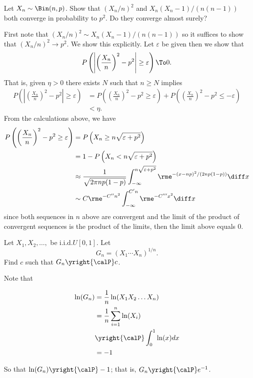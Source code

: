 \begin{problem}[DasGupta 7.17]
  Let \(X_n\sim\Bin(n,p)\). Show that \((X_n/n)^2\) and
  \(X_n(X_n-1)/(n(n-1))\) both converge in probability to \(p^2\). Do
  they converge almost surely?
\end{problem}
\begin{solution}
  First note that \((X_n/n)^2\sim X_n(X_n-1)/(n(n-1))\) so it suffices to
  show that \((X_n/n)^2\to p^2\). We show this explicitly. Let
  \(\varepsilon\) be given then we show that
  \[
    P\left(\left|\left(\frac{X_n}{n}\right)^2
        -p^2\right|\geq\varepsilon\right)\To 0.
  \]
  That is, given \(\eta>0\) there exists \(N\) such that \(n\geq N\)
  implies
  \begin{align*}
    P\left(\left|\left(\frac{X_n}{n}\right)^2
        -p^2\right|\geq\varepsilon\right)
    &=P\left(\left(\frac{X_n}{n}\right)^2
      -p^2\geq\varepsilon\right)
      +P\left(\left(\frac{X_n}{n}\right)^2
      -p^2\leq-\varepsilon\right)\\
    &<\eta.
  \end{align*}
  From the calculations above, we have
  \begin{align*}
    P\left(\left(\frac{X_n}{n}\right)^2
    -p^2\geq\varepsilon\right)
    &=P\left(X_n\geq n\sqrt{\varepsilon+p^2}\right)\\
    &=1-P\left(X_n<n\sqrt{\varepsilon+p^2}\right)\\
    &\approx\frac{1}{\sqrt{2\pi n p(1-p)}}\int_{-\infty}^{n\sqrt{\varepsilon+p^2}}
      \rme^{-(x-np)^2/(2np(1-p))}\diff x
    \\
    &\sim C\rme^{-C''n^2}\int_{-\infty}^{C'n}\rme^{-C'''x^2}\diff x
  \end{align*}
  since both sequences in \(n\) above are convergent and the limit of the
  product of convergent sequences is the product of the limits, then the
  limit above equals \(0\).
\end{solution}
\newpage

\begin{problem}[DasGupta 7.21]
  Let \(X_1,X_2,\dotsc,\) be i.i.d.\@ \(U[0,1]\). Let
  \[
    G_n=(X_1\dotsm X_n)^{1/n}.
  \]
  Find \(c\) such that \(G_n\yright{\calP} c\).
\end{problem}
\begin{solution}

Note that

\begin{align*}
  \ln(G_n) &= \frac{1}{n} \ln(X_1 X_2 \ldots X_n) \\
           &= \frac{1}{n} \sum_{i=1}^n \ln(X_i) \\
           &\yright{\calP} \int_0^1 \ln(x) dx \\
           &= -1 \\
\end{align*}

So that $\ln(G_n) \yright{\calP} -1$; that is, $G_n \yright{\calP} e^{-1}$.

\end{solution}
\newpage

